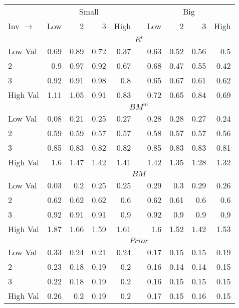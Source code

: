 
\begin{tabular}{lrrrrlrrrr}
  \toprule
    & \multicolumn{4}{c}{Small} & & \multicolumn{4}{c}{Big} \\
      \cmidrule(r){2-5} \cmidrule(r){7-10}
  Inv $\rightarrow$ & Low & 2 & 3 & High & & Low & 2 & 3 & High \\ 
  \midrule
  

    & \multicolumn{9}{c}{$R^i$} \\
    Low Val    & 0.69  & 0.89  & 0.72  & 0.37  & & 0.63  & 0.52  & 0.56  & 0.5  \\
           2   & 0.9  & 0.97  & 0.92  & 0.67  & & 0.68  & 0.47  & 0.55  & 0.42  \\
           3   & 0.92  & 0.91  & 0.98  & 0.8  & & 0.65  & 0.67  & 0.61  & 0.62  \\
    High Val   & 1.11  & 1.05  & 0.91  & 0.83  & & 0.72  & 0.65  & 0.84  & 0.69  \\
    [1em]
  

    & \multicolumn{9}{c}{$BM^m$} \\
    Low Val    & 0.08  & 0.21  & 0.25  & 0.27  & & 0.28  & 0.28  & 0.27  & 0.24  \\
           2   & 0.59  & 0.59  & 0.57  & 0.57  & & 0.58  & 0.57  & 0.57  & 0.56  \\
           3   & 0.85  & 0.83  & 0.82  & 0.82  & & 0.85  & 0.83  & 0.83  & 0.81  \\
    High Val   & 1.6  & 1.47  & 1.42  & 1.41  & & 1.42  & 1.35  & 1.28  & 1.32  \\
    [1em]
  

    & \multicolumn{9}{c}{$BM$} \\
    Low Val    & 0.03  & 0.2  & 0.25  & 0.25  & & 0.29  & 0.3  & 0.29  & 0.26  \\
           2   & 0.62  & 0.62  & 0.62  & 0.6  & & 0.62  & 0.61  & 0.6  & 0.6  \\
           3   & 0.92  & 0.91  & 0.91  & 0.9  & & 0.92  & 0.9  & 0.9  & 0.9  \\
    High Val   & 1.87  & 1.66  & 1.59  & 1.61  & & 1.6  & 1.52  & 1.42  & 1.53  \\
    [1em]
  

    & \multicolumn{9}{c}{$Prior$} \\
    Low Val    & 0.33  & 0.24  & 0.21  & 0.24  & & 0.17  & 0.15  & 0.15  & 0.19  \\
           2   & 0.23  & 0.18  & 0.19  & 0.2  & & 0.16  & 0.14  & 0.14  & 0.15  \\
           3   & 0.22  & 0.18  & 0.19  & 0.2  & & 0.16  & 0.15  & 0.15  & 0.15  \\
    High Val   & 0.26  & 0.2  & 0.19  & 0.2  & & 0.17  & 0.15  & 0.16  & 0.15  \\
    [1em]
  


\end{tabular}
